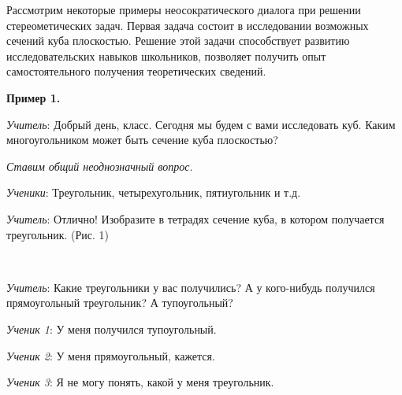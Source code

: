 \documentclass[a4paper,14pt,russian]{extreport}
\newcommand{\capt}[1]{%
    \\[8pt]
    \text{Рис. #1}
}
\begin{document}
Рассмотрим некоторые примеры неосократического диалога при решении стереометических задач. Первая задача состоит в исследовании возможных сечений куба плоскостью. Решение этой задачи способствует развитию исследовательских навыков школьников, позволяет получить опыт самостоятельного получения теоретических сведений. 


\textbf{Пример 1.}

 \textit{Учитель}: Добрый день, класс. Сегодня мы будем с вами исследовать куб. Каким многоугольником может быть сечение куба плоскостью? 
 
 \textit{Ставим общий неоднозначный вопрос.}
 
 \textit{Ученики}: Треугольник, четырехугольник, пятиугольник и т.д.

 \textit{Учитель}: Отлично! Изобразите в тетрадях сечение куба, в котором получается треугольник. (Рис. 1)

 \begin{center}
    \begin{minipage}{0.3\textwidth}
        \centering
    \end{minipage}
  \hspace{-0.2cm}
    \begin{minipage}{0.3\textwidth}
        \centering
    \end{minipage}
      \hspace{-0.2cm}
    \begin{minipage}{0.3\textwidth}
        \centering
    \end{minipage}
    \capt{1}
\end{center}

\textit{Учитель}: Какие треугольники у вас получились? А у кого-нибудь получился прямоугольный треугольник? А тупоугольный? 

\textit{Ученик 1}: У меня получился тупоугольный. 

\textit{Ученик 2}: У меня прямоугольный, кажется. 

\textit{Ученик 3}: Я не могу понять, какой у меня треугольник.
\end{document}
